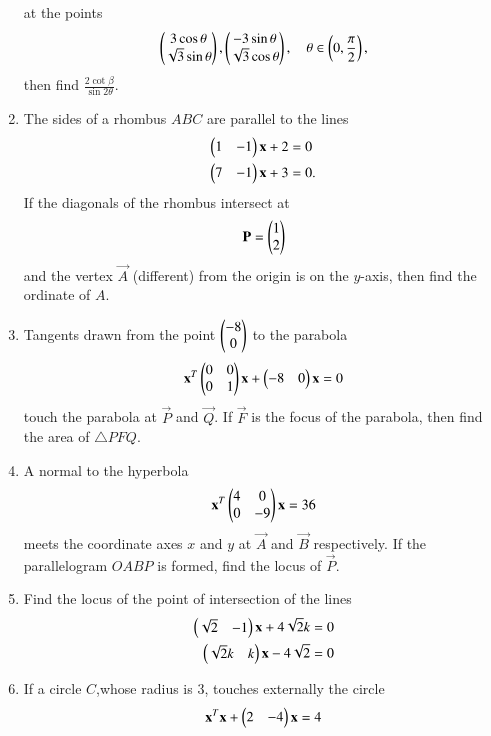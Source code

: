 \documentclass[journal,12pt,twocolumn]{IEEEtran}
\begin{document}
\begin{enumerate}[label=\arabic*.]
\begin{equation}
\end{equation}
%
at the points
\begin{equation}
\begin{pmatrix}3\cos\theta\\ \sqrt{3}\sin \theta\end{pmatrix},
\begin{pmatrix}-3\sin\theta\\ \sqrt{3}\cos \theta\end{pmatrix}, \quad \theta \in \left(0,\frac{\pi}{2}\right),
\end{equation}
then find $\frac{2\cot \beta}{\sin 2\theta}$.
\item The sides of a rhombus $ABC$ are parallel to the lines
\begin{align}
\begin{pmatrix}1 & -1\end{pmatrix}\mathbf{x} + 2 &=0
\\
\begin{pmatrix}7 & -1\end{pmatrix}\mathbf{x} + 3 &=0.
\end{align}
If the diagonals of the rhombus intersect at
\begin{align}
\mathbf{P} = \begin{pmatrix}1 \\ 2\end{pmatrix}
\end{align}
and the vertex $\vec{A}$ (different) from the origin is on the $y$-axis, then find the ordinate of $A$.
\item Tangents drawn from the point $\begin{pmatrix}-8\\0\end{pmatrix}$ to the parabola
\begin{equation}
\mathbf{x}^T\begin{pmatrix}0 & 0 \\ 0 & 1\end{pmatrix}\mathbf{x} + \begin{pmatrix}-8 & 0\end{pmatrix}\mathbf{x} 
 = 0
\end{equation}
%
touch the parabola at $\vec{P}$ and  $\vec{Q}$. If $\vec{F}$ is the focus of the parabola, then find the area 
of $\triangle PFQ$.
\item A normal to the hyperbola 
\begin{equation}
\mathbf{x}^T\begin{pmatrix}4 & 0 \\ 0 & -9\end{pmatrix}\mathbf{x} 
 = 36
\end{equation}
%
meets the coordinate axes $x$ and $y$ at $\vec{A}$ and $\vec{B}$ respectively.  If the parallelogram $OABP$ is 
formed, find the locus of $\vec{P}$.
\item Find the locus of the point of intersection of the lines
\begin{align}
\begin{pmatrix}\sqrt{2} & -1 \end{pmatrix}\mathbf{x} + 4 \sqrt{2}k &= 0
\\
\begin{pmatrix}\sqrt{2}k & k \end{pmatrix}\mathbf{x} - 4 \sqrt{2} &= 0
\end{align}
\item If a circle $C$,whose radius is 3, touches externally the circle 
\begin{equation}
\mathbf{x}^T\mathbf{x} + \begin{pmatrix}2 & -4\end{pmatrix}\mathbf{x} = 4
\end{equation}

\end{enumerate}
\end{document}
